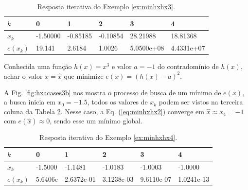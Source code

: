\begin{table}[!h]
\centering
\begin{tabular}{|l|l|l|l|l|l|}
\hline
$k$      & 0 & 1 & 2 & 3 & 4 \\ \hline
$x_k$    & -1.50000 & -0.85185 & -0.10854 & 28.21988 & 18.81368 \\ \hline
$e(x_k)$ & 19.141 & 2.6184 & 1.0026 & 5.0500e+08 & 4.4331e+07 \\ \hline
\end{tabular}
\caption{Resposta iterativa do Exemplo \ref{ex:minhxhx3}.}
\label{tab:hxacases3}
\end{table}


\begin{example}\label{ex:minhxhx4}
Conhecida uma função $h(x)=x^3$ e valor $a=-1$ do contradomínio de $h(x)$,
achar o valor $x=\hat{x}$ que minimize $e(x)=(h(x)-a)^2$.
\end{example}
\begin{SolutionT}\label{sol:minhxhx4}
A Fig. \ref{fig:hxacases3b} nos mostra o processo de busca de um mínimo
 de $e(x)$, a busca inicia em $x_0=-1.5$,
 todos os valores de $x_{k}$ podem ser vistos na terceira coluna da
Tabela \ref{tab:hxacases4}. Nesse caso, a Eq. (\ref{eq:minhxhx2}) converge
em $\hat{x}\approx x_4 =-1$ com $e(\hat{x})\approx 0$, sendo esse um mínimo global.
\end{SolutionT}

\begin{table}[!h]
\centering
\begin{tabular}{|l|l|l|l|l|l|}
\hline
$k$      & 0 & 1 & 2 & 3 & 4 \\ \hline
$x_k$    & -1.5000 & -1.1481 & -1.0183 & -1.0003 & -1.0000 \\ \hline
$e(x_k)$ & 5.6406e & 2.6372e-01 & 3.1238e-03 & 9.6110e-07 & 1.0241e-13 \\ \hline
\end{tabular}
\caption{Resposta iterativa do Exemplo \ref{ex:minhxhx4}.}
\label{tab:hxacases4}
\end{table}

